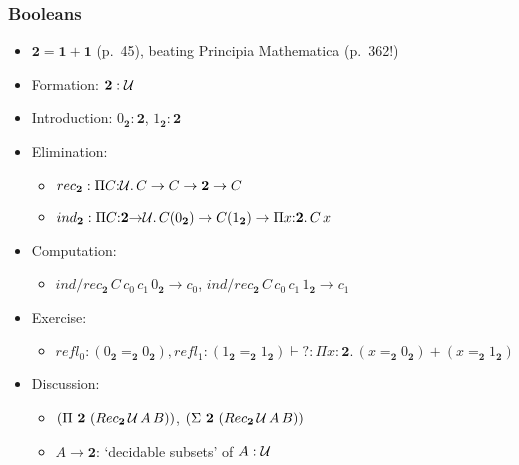 \documentclass[handout]{beamer}
\newcommand{\depi}[3]{\Pi{#1{:}#2.\,#3}}
\newcommand{\UU}{{\cal U}}
\newcommand{\bfone}{\mathbf{1}}
\newcommand{\bftwo}{\mathbf{2}}
\begin{document}
\frame
  {
  
    \frametitle{Booleans}

    \begin{itemize}[<+->]
    \item $\bftwo = \bfone + \bfone$ (p.~45), beating Principia Mathematica (p.~362!)
    \item Formation:  $\bftwo:\UU$
    \item Introduction: $0_\bftwo : \bftwo$, $1_\bftwo : \bftwo$
    \item Elimination:
      \begin{itemize}[<+->]
      \item $rec_\bftwo : \depi{C}{\UU}{C \to C \to \bftwo \to C}$ 
      \item $ind_\bftwo : \depi{C}{\bftwo{\to}\UU}
                          {C(0_\bftwo) \to C(1_\bftwo) \to\depi{x}{\bftwo}{C\,x}}$
      \end{itemize}  
    \item Computation:
      \begin{itemize}[<+->]
      \item $ind/rec_\bftwo\,C\,c_0\,c_1\,0_\bftwo \to c_0$, 
            $ind/rec_\bftwo\,C\,c_0\,c_1\,1_\bftwo \to c_1$
      \end{itemize}
    \item Exercise:
      \begin{itemize}[<+->]
      \item $refl_{0}{:}(0_\bftwo{=}_\bftwo 0_\bftwo),
             refl_{1}{:}(1_\bftwo{=}_\bftwo 1_\bftwo) 
          \vdash  ? : \depi{x}{\bftwo}{(x{=}_\bftwo 0_\bftwo) + (x{=}_\bftwo 1_\bftwo)}$
      \end{itemize} 
    \item Discussion: 
      \begin{itemize}[<+->]
      \item $(\Pi~\bftwo~(Rec_\bftwo\,\UU\,A\,B))$, $(\Sigma~\bftwo~(Rec_\bftwo\,\UU\,A\,B))$
      \item $A\to\bftwo$: `decidable subsets' of $A:\UU$
      \end{itemize}
    \end{itemize}
  }
\end{document}
